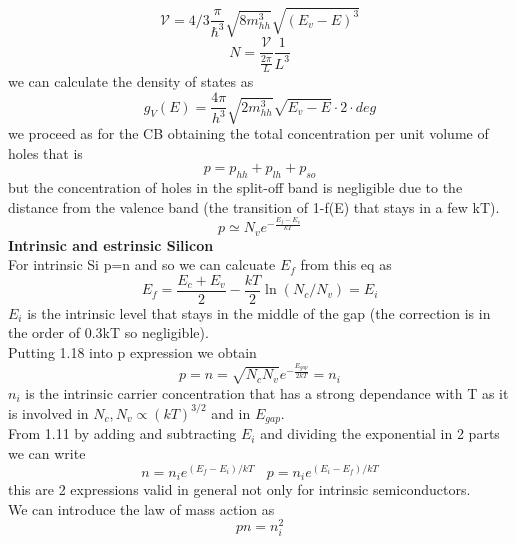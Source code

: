 \begin{equation}
\mathcal{V}=4/3\frac{\pi}{\hslash^3}\sqrt{8m_{hh}^3}\sqrt{(E_v-E)^3} 
\end{equation}
\begin{equation}
N=\frac{\mathcal{V}}{\frac{2\pi}{L}}\frac{1}{L^3}
\end{equation}
we can calculate the density of states as
\begin{equation}
g_V(E)=\frac{4\pi}{h^3}\sqrt{2m_{hh}^3}\sqrt{E_v-E}\cdot 2 \cdot deg
\end{equation}
we proceed as for the CB obtaining the total concentration per unit volume of holes that is 
\begin{equation}
p=p_{hh}+p_{lh}+p_{so}
\end{equation}
but the concentration of holes in the split-off band is negligible due to the distance from the valence band (the transition of 1-f(E) that stays in a few kT).\\
\begin{equation}
p\simeq N_v e^{-\frac{E_f-E_v}{kT}}
\end{equation}
\newline
{\bf Intrinsic and estrinsic Silicon}\\
For intrinsic Si p=n and so we can calcuate $E_f$ from this eq as
\begin{equation}
E_f=\frac{E_c+E_v}{2}-\frac{kT}{2}\ln(N_c/N_v)=E_i 
\end{equation}
$E_i$ is the intrinsic level that stays in the middle of the gap (the correction is in the order of 0.3kT so negligible).\\
Putting 1.18 into p expression we obtain
\begin{equation}
p=n=\sqrt{N_cN_v}e^{-\frac{E_{gap}}{2kT}}=n_i
\end{equation}
$n_i$ is the intrinsic carrier concentration that has a strong dependance with T as it is involved in $N_c,N_v \propto (kT)^{3/2}$ and in $E_{gap}$.\\
From 1.11 by adding and subtracting $E_i$ and dividing the exponential in 2 parts we can write 
\begin{equation}
n=n_ie^{(E_f-E_i)/kT}\ \ \ \ p=n_ie^{(E_i-E_f)/kT}
\end{equation}
this are 2 expressions valid in general not only for intrinsic semiconductors.\\
We can introduce the law of mass action as 
\begin{equation}
pn=n_i^2
\end{equation}
